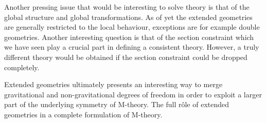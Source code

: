 Another pressing issue that would be interesting to solve theory is that of the global structure and global transformations. As of yet the extended geometries are generally restricted to the local behaviour, exceptions are for example double geometries. Another interesting question is that of the section constraint which we have seen play a crucial part in defining a consistent theory. However, a truly different theory would be obtained if the section constraint could be dropped completely. 

Extended geometries ultimately presents an interesting way to merge gravitational and non-gravitational degrees of freedom in order to exploit a larger part of the underlying symmetry of M-theory. The full rôle of extended geometries in a complete formulation of M-theory. 